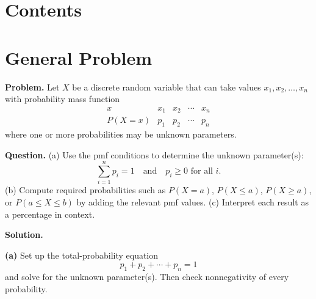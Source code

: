 


	\newcommand{\PMFHighlight}[2]{%
		\addplot+[ycomb, mark=*, line width=0.8pt, blue] coordinates {#1};
		\addplot+[ycomb, mark=*, line width=1.3pt, black] coordinates {#2};
	}
	

\section*{Contents}
\tableofcontents
		\section*{General Problem}
		
		\textbf{Problem.}
		Let $X$ be a discrete random variable that can take values $x_1,x_2,\dots,x_n$ with probability mass function
		\[
		\begin{array}{c|cccc}
			x & x_1 & x_2 & \cdots & x_n\\
			\hline
			P(X=x) & p_1 & p_2 & \cdots & p_n
		\end{array}
		\]
		where one or more probabilities may be unknown parameters.
		
		\textbf{Question.}
		(a) Use the pmf conditions to determine the unknown parameter(s):
		\[
		\sum_{i=1}^{n}p_i=1\quad\text{and}\quad p_i\ge 0\text{ for all }i.
		\]
		(b) Compute required probabilities such as $P(X=a)$, $P(X\le a)$, $P(X\ge a)$, or $P(a\le X\le b)$ by adding the relevant pmf values.
		(c) Interpret each result as a percentage in context.
		
		\textbf{Solution.}
		
		\textbf{(a)} Set up the total-probability equation
		\[
		p_1+p_2+\cdots+p_n=1
		\]
		and solve for the unknown parameter(s). Then check nonnegativity of every probability.
		
